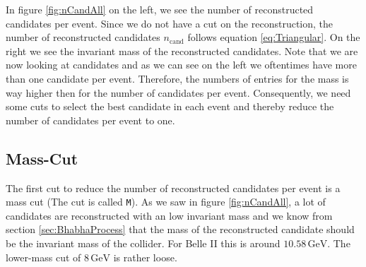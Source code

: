 \documentclass[a4paper,11pt,twosided,final,german,openbib,pdftex,listof=totoc,bibliography=totoc]{scrbook}
\begin{document}
In figure \ref{fig:nCandAll} on the left, we see the number of reconstructed candidates per event. Since we do not have a cut on the reconstruction, the number of reconstructed candidates $n_{\textrm{cand}}$ follows equation \ref{eq:Triangular}. On the right we see the invariant mass of the reconstructed candidates. Note that we are now looking at candidates and as we can see on the left we oftentimes have more than one candidate per event. Therefore, the numbers of entries for the mass is way higher then for the number of candidates per event.
Consequently, we need some cuts to select the best candidate in each event and thereby reduce the number of candidates per event to one.


\subsection{Mass-Cut}

The first cut to reduce the number of reconstructed candidates per event is a mass cut (The cut is called \texttt{M}). As we saw in figure \ref{fig:nCandAll}, a lot of candidates are reconstructed with an low invariant mass and we know from section \ref{sec:BhabhaProcess} that the mass of the reconstructed candidate should be the invariant mass of the collider. For Belle II this is around $10.58\,\textrm{GeV}$. The lower-mass cut of $8\,\textrm{GeV}$ is rather loose. 
\end{document}
